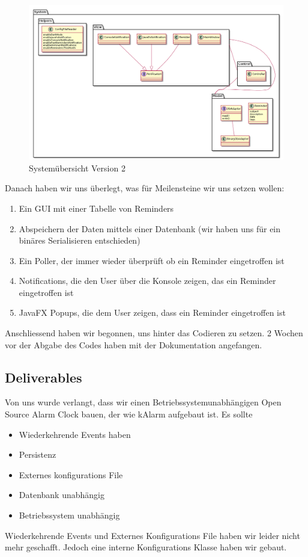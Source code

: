 \documentclass[11pt,titelpage]{scrartcl}
\begin{document}
\begin{figure}
  \centering
    \includegraphics[width=1\textwidth]{../uml/uebersicht01.png}
  \caption{Systemübersicht Version 2}
  \label{fig:overview}
\end{figure}
Danach haben wir uns überlegt, was für Meilensteine wir uns setzen wollen:
\begin{enumerate}
  \item Ein GUI mit einer Tabelle von Reminders
  \item Abspeichern der Daten mittels einer Datenbank (wir haben uns für ein binäres Serialisieren entschieden)
  \item Ein Poller, der immer wieder überprüft ob ein Reminder eingetroffen ist
  \item Notifications, die den User über die Konsole zeigen, das ein Reminder eingetroffen ist
  \item JavaFX Popups, die dem User zeigen, dass ein Reminder eingetroffen ist
\end{enumerate}
Anschliessend haben wir begonnen, uns hinter das Codieren zu setzen. 2 Wochen vor der Abgabe des Codes haben mit der Dokumentation angefangen.
\subsection{Deliverables}
Von uns wurde verlangt, dass wir einen Betriebssystemunabhängigen Open Source Alarm Clock bauen, der wie kAlarm aufgebaut ist.
Es sollte
\begin{itemize}
  \item Wiederkehrende Events haben
  \item Persistenz
  \item Externes konfigurations File
  \item Datenbank unabhängig
  \item Betriebssystem unabhängig
\end{itemize}
Wiederkehrende Events und Externes Konfigurations File haben wir leider nicht mehr geschafft. Jedoch eine interne Konfigurations Klasse haben wir gebaut.
\end{document}

